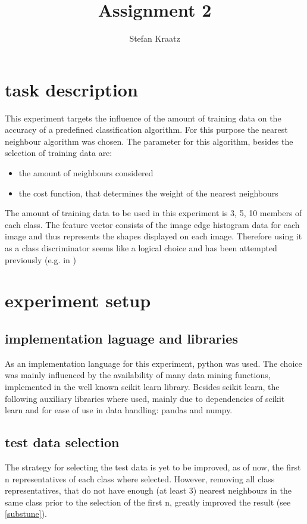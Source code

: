 \documentclass[10pt,a4paper]{proc}
\author{Stefan Kraatz}
\title{Assignment 2}
\begin{document}
\maketitle
\section{task description}
This experiment targets the influence of the amount of training data on the accuracy of a predefined classification algorithm. For this purpose the nearest neighbour algorithm was chosen. The parameter for this algorithm, besides the selection of training data are:
\begin{itemize}
\item the amount of neighbours considered
\item the cost function, that determines the weight of the nearest neighbours
\end{itemize}
The amount of training data to be used in this experiment is 3, 5, 10 members of each class. The feature vector consists of the image edge histogram data for each image and thus represents the shapes displayed on each image. Therefore using it as a class discriminator seems like a logical choice and has been attempted previously (e.g. in \cite{4610973})
\section{experiment setup}
\subsection*{implementation laguage and libraries}
As an implementation language for this experiment, python was used. The choice was mainly influenced by the availability of many data mining functions, implemented in the well known scikit learn library. Besides scikit learn, the following auxiliary libraries where used, mainly due to dependencies of scikit learn and for ease of use in data handling: pandas and numpy.
\subsection*{test data selection}
The strategy for selecting the test data is yet to be improved, as of now, the first n representatives of each class where selected. However, removing all class representatives, that do not have enough (at least 3) nearest neighbours in the same class prior to the selection of the first n, greatly improved the result (see \ref{substune}).
\end{document}

